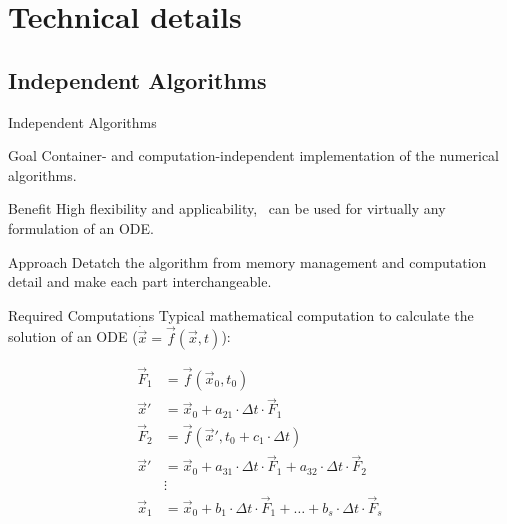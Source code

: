 \section{Technical details}


\begin{frame}
  \tableofcontents[currentsection] 
\end{frame}

\subsection{Independent Algorithms}

\begin{frame}{Independent Algorithms}

\begin{block}{Goal}
 Container- and computation-independent implementation of the numerical algorithms.  
\end{block}

\begin{block}{Benefit}
 High flexibility and applicability, \odeint\ can be used for virtually any formulation of an ODE.
\end{block}
 
\begin{block}{Approach}
 Detatch the algorithm from memory management and computation detail and make each part interchangeable.
\end{block}

\end{frame}

\begin{frame}{Required Computations}
 Typical mathematical computation to calculate the solution of an ODE ($\dot{\vec x} = \vec f(\vec x , t)$):

\begin{align*}
 \vec F_1 &= \vec f( \vec x_0 , t_0 ) \\
 \vec x' &= \vec x_0 + a_{21} \cdot \Delta t \cdot \vec F_1 \\
 \vec F_2 &= \vec f( \vec x' , t_0 + c_1\cdot\Delta t ) \\
 \vec x' &= \vec x_0 + a_{31} \cdot \Delta t \cdot \vec F_1 + a_{32} \cdot \Delta t \cdot \vec F_2 \\
         &\vdots \\
 \vec x_1 &= \vec x_0 + b_1\cdot \Delta t \cdot \vec F_1 + \dots + b_s\cdot \Delta t \cdot \vec F_s
\end{align*} 

\end{frame}

